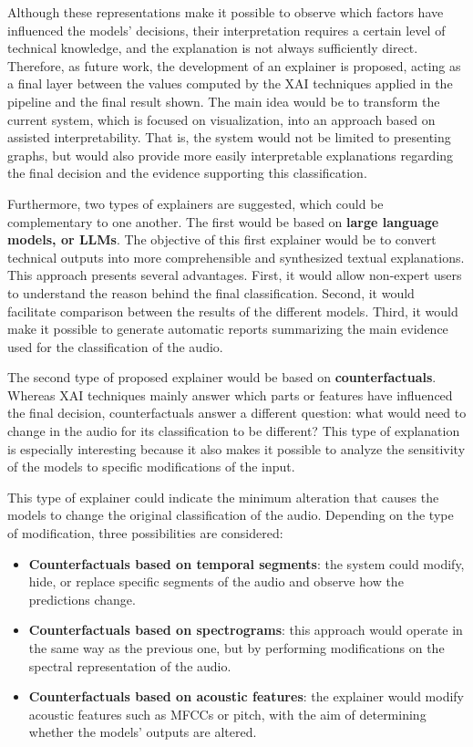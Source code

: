 Although these representations make it possible to observe which factors have influenced the models' decisions, their interpretation requires a certain level of technical knowledge, and the explanation is not always sufficiently direct. Therefore, as future work, the development of an explainer is proposed, acting as a final layer between the values computed by the XAI techniques applied in the pipeline and the final result shown.
The main idea would be to transform the current system, which is focused on visualization, into an approach based on assisted interpretability. That is, the system would not be limited to presenting graphs, but would also provide more easily interpretable explanations regarding the final decision and the evidence supporting this classification.

Furthermore, two types of explainers are suggested, which could be complementary to one another. The first would be based on \textbf{large language models, or LLMs}. The objective of this first explainer would be to convert technical outputs into more comprehensible and synthesized textual explanations. This approach presents several advantages. First, it would allow non-expert users to understand the reason behind the final classification. Second, it would facilitate comparison between the results of the different models.
Third, it would make it possible to generate automatic reports summarizing the main evidence used for the classification of the audio.

The second type of proposed explainer would be based on \textbf{counterfactuals}. Whereas XAI techniques mainly answer which parts or features have influenced the final decision, counterfactuals answer a different question: what would need to change in the audio for its classification to be different?
This type of explanation is especially interesting because it also makes it possible to analyze the sensitivity of the models to specific modifications of the input.

This type of explainer could indicate the minimum alteration that causes the models to change the original classification of the audio. Depending on the type of modification, three possibilities are considered:
\begin{itemize}
    \item \textbf{Counterfactuals based on temporal segments}: the system could modify, hide, or replace specific segments of the audio and observe how the predictions change.
    \item \textbf{Counterfactuals based on spectrograms}: this approach would operate in the same way as the previous one, but by performing modifications on the spectral representation of the audio.
    \item \textbf{Counterfactuals based on acoustic features}: the explainer would modify acoustic features such as MFCCs or pitch, with the aim of determining whether the models' outputs are altered.
\end{itemize}

